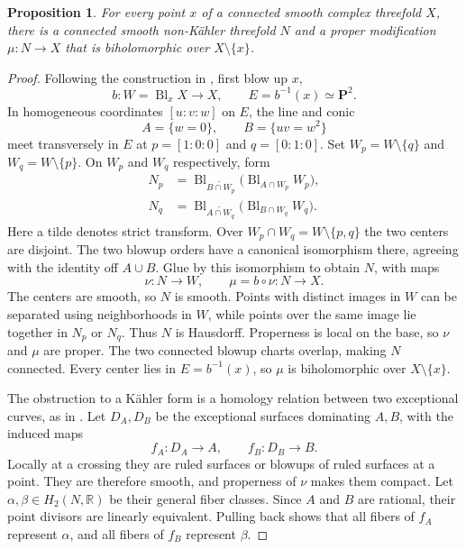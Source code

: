 \documentclass[11pt]{amsart}
\newtheorem{proposition}[theorem]{Proposition}
\theoremstyle{definition}
\theoremstyle{remark}
\numberwithin{equation}{section}
\newcommand{\R}{\mathbb R}
\newcommand{\PP}{\mathbf P}
\newcommand{\Bl}{\operatorname{Bl}}
\begin{document}
\begin{proposition}\label{prop:point-modification}
For every point $x$ of a connected smooth complex threefold $X$,
there is a connected smooth non-K\"ahler threefold $N$ and a proper
modification $\mu:N\to X$ that is biholomorphic over
$X\setminus\{x\}$.
\end{proposition}
\begin{proof}
Following the construction in \cite[\S6]{Barlet2015}, first blow up $x$,
\[
 b:W=\Bl_xX\to X,\qquad E=b^{-1}(x)\simeq\PP^2.
\]
In homogeneous coordinates $[u:v:w]$ on $E$, the line and conic
\[
 A=\{w=0\},\qquad B=\{uv=w^2\}
\]
meet transversely in $E$ at $p=[1:0:0]$ and $q=[0:1:0]$.
Set $W_p=W\setminus\{q\}$ and $W_q=W\setminus\{p\}$.
On $W_p$ and $W_q$ respectively, form
\[
 \begin{split}
 N_p&=\Bl_{\widetilde{B\cap W_p}}
             \bigl(\Bl_{A\cap W_p}W_p\bigr),\\
 N_q&=\Bl_{\widetilde{A\cap W_q}}
             \bigl(\Bl_{B\cap W_q}W_q\bigr).
 \end{split}
\]
Here a tilde denotes strict transform. Over
$W_p\cap W_q=W\setminus\{p,q\}$ the two centers are disjoint.
The two blowup orders have a canonical isomorphism there, agreeing
with the identity off $A\cup B$. Glue by this isomorphism to
obtain $N$, with maps
\[
 \nu:N\longrightarrow W,\qquad \mu=b\circ\nu:N\longrightarrow X.
\]
The centers are smooth, so $N$ is smooth. Points with distinct images
in $W$ can be separated using neighborhoods in $W$, while points over
the same image lie together in $N_p$ or $N_q$. Thus $N$ is Hausdorff.
Properness is local on the base, so $\nu$ and $\mu$ are proper.
The two connected blowup charts overlap, making $N$ connected.
Every center lies in $E=b^{-1}(x)$, so $\mu$ is biholomorphic over
$X\setminus\{x\}$.

The obstruction to a K\"ahler form is a homology relation between
two exceptional curves, as in \cite[Tag~08J1]{StacksHironaka}.
Let $D_A,D_B$ be the exceptional surfaces dominating $A,B$, with
the induced maps
\[
 f_A:D_A\longrightarrow A,\qquad f_B:D_B\longrightarrow B.
\]
Locally at a crossing they are ruled surfaces or blowups of ruled
surfaces at a point. They are therefore smooth, and properness of
$\nu$ makes them compact.
Let $\alpha,\beta\in H_2(N,\R)$ be their general fiber classes.
Since $A$ and $B$ are rational, their point divisors are linearly
equivalent. Pulling back shows that all fibers of $f_A$ represent
$\alpha$, and all fibers of $f_B$ represent $\beta$.


\end{proof}
\end{document}
